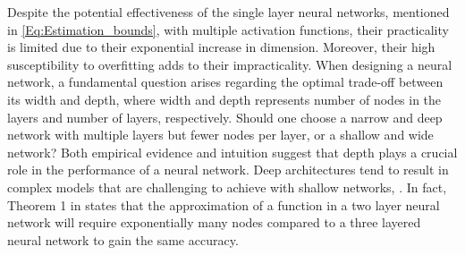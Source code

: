Despite the potential effectiveness of the single layer neural networks, mentioned in \eqref{Eq:Estimation_bounds}, with multiple activation functions, their practicality is limited due to their exponential increase in dimension. Moreover, their high susceptibility to overfitting adds to their impracticality. When designing a neural network, a fundamental question arises regarding the optimal trade-off between its width and depth, where width and depth represents number of nodes in the layers and number of layers, respectively. Should one choose a narrow and deep network with multiple layers but fewer nodes per layer, or a shallow and wide network? Both empirical evidence and intuition suggest that depth plays a crucial role in the performance of a neural network. Deep architectures tend to result in complex models that are challenging to achieve with shallow networks, \citep{REOS}. In fact, Theorem 1 in \citep{REOS} states that the approximation of a function in a two layer neural network will require exponentially many nodes compared to a three layered neural network to gain the same accuracy. %

















